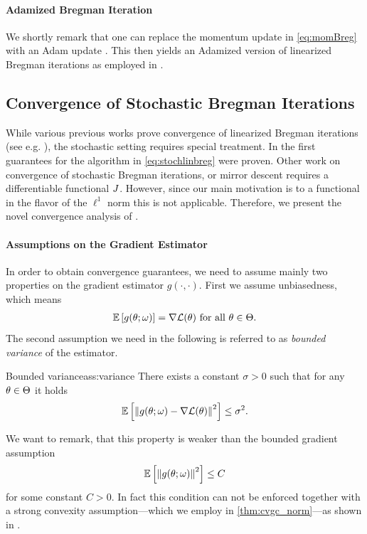 \paragraph{Adamized Bregman Iteration} We shortly remark that one can replace the momentum update in \cref{eq:momBreg} with an Adam update \cite{kingma2014adam}. This then yields an Adamized version of linearized Bregman iterations as employed in \cite{bungert2022bregman}.


\subsection{Convergence of Stochastic Bregman Iterations}\label{sec:ConvAna}
%
%
While various previous works prove convergence of linearized Bregman iterations (see e.g. \cite{osher2005iterative, cai2009convergence}), the stochastic setting requires special treatment. In \cite{bungert2022bregman} the first guarantees for the algorithm in \cref{eq:stochlinbreg} were proven. Other work on convergence of stochastic Bregman iterations, or mirror descent \cite{dragomir2021fast, hanzely2021fastest, zhang2018convergence, d2021stochastic, aubin2022mirror} requires a differentiable functional $J$. However, since our main motivation is to a functional in the flavor of the $\ell^1$ norm this is not applicable. Therefore, we present the novel convergence analysis of \cite{bungert2022bregman}.
%
%
\paragraph{Assumptions on the Gradient Estimator}
%
In order to obtain convergence guarantees, we need to assume mainly two properties on the gradient estimator $g(\cdot,\cdot)$. First we assume unbiasedness, which means
%
\begin{align*}
	\mathbb{E}\left[g(\theta;\omega)\right] = \nabla\mathcal{L}(\theta)\text{ for all }\theta\in\Theta.
\end{align*}
%
The second assumption we need in the following is referred to as \emph{bounded variance} of the estimator.
%
\begin{assumption}{Bounded variance}{ass:variance}
	There exists a constant $\sigma>0$ such that for any $\theta\in\Theta$ it holds
	\begin{align}
		\mathbb{E}\left[\left\|g(\theta;\omega)-\nabla\mathcal{L}(\theta)\right\|^2\right] \leq \sigma^2.
	\end{align}
\end{assumption}
%
%
\begin{remark}{}{}
	We want to remark, that this property is weaker than the bounded gradient assumption
	\begin{align*}
		\mathbb{E}\left[\left\|g(\theta;\omega)\right\|^2\right] \leq C
	\end{align*}
	for some constant $C>0$. In fact this condition can not be enforced together with a strong convexity assumption---which we employ in \cref{thm:cvgc_norm}---as shown in \cite{pmlr-v80-nguyen18c}.
\end{remark}
